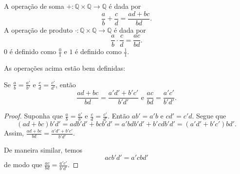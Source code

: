 \begin{definition}\label{def:operacoesNumerosRacionais}
A operação de soma $+:\mathbb Q\times\mathbb Q\to\mathbb Q$ é dada por
\[
    \frac{a}{b}+\frac{c}{d} = \frac{ad+bc}{bd}.
\]
A operação de produto $\cdot:\mathbb Q\times\mathbb Q\to\mathbb Q$ é dada por
\[
    \frac{a}{b}\cdot\frac{c}{d} = \frac{ac}{bd}.
\]
$0$ é definido como $\frac{0}{1}$ e $1$ é definido como $\frac{1}{1}$.
\end{definition}
As operações acima estão bem definidas:
\begin{lemma}
    Se $\frac{a}{b}=\frac{a'}{b'}$ e $\frac{c}{d}=\frac{c'}{d'}$, então
    \[
        \frac{ad+bc}{bd} = \frac{a'd'+b'c'}{b'd'} \text{ e } \frac{ac}{bd} = \frac{a'c'}{b'd'}.
    \]
\end{lemma}
\begin{proof}
    Suponha que $\frac{a}{b}=\frac{a'}{b'}$ e $\frac{c}{d}=\frac{c'}{d'}$.
    Então $ab'=a'b$ e $cd'=c'd$.
    Segue que
    \[
        (ad+bc)b'd' = adb'd' + bcb'd' = a'bdb'd' + b'cdb'd' = (a'd'+b'c')bd'.
    \]
    Assim, $\frac{ad+bc}{bd} = \frac{a'd'+b'c'}{b'd'}$.

    De maneira similar, temos
    \[
        acb'd' = a'cbd'
    \]
    de modo que $\frac{ac}{bd} = \frac{a'c'}{b'd'}$.
\end{proof}

